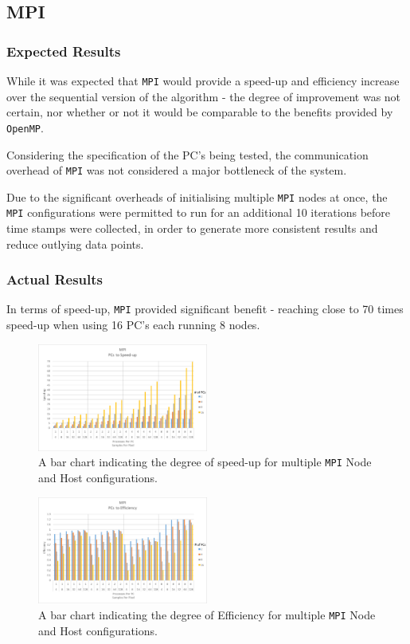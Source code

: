 \documentclass[journal,transmag]{IEEEtran}
\begin{document}
	\subsection{MPI}
		\subsubsection{Expected Results}
			While it was expected that \texttt{MPI} would provide a speed-up and efficiency increase over the sequential version of the algorithm - the degree of improvement was not certain, nor whether or not it would be comparable to the benefits provided by \texttt{OpenMP}.
			
			Considering the specification of the PC's being tested, the communication overhead of \texttt{MPI} was not considered a major bottleneck of the system.
			
			Due to the significant overheads of initialising multiple \texttt{MPI} nodes at once, the \texttt{MPI} configurations were permitted to run for an additional 10 iterations before time stamps were collected, in order to generate more consistent results and reduce outlying data points.
			
		\subsubsection{Actual Results}
			In terms of speed-up, \texttt{MPI} provided significant benefit - reaching close to 70 times speed-up when using 16 PC's each running 8 nodes.
		
		\begin{figure}[h]
			\centering
			\includegraphics[width = 0.5\textwidth]{chartMPISpeed}
			\caption{A bar chart indicating the degree of speed-up for multiple \texttt{MPI} Node and Host configurations.}
			\label{fig_mpi_speed}
		\end{figure}
		
		\begin{figure}[h]
			\centering
			\includegraphics[width = 0.5\textwidth]{chartMPIEff}
			\caption{A bar chart indicating the degree of Efficiency for multiple \texttt{MPI} Node and Host configurations.}
			\label{fig_mpi_eff}
		\end{figure}
\end{document}
